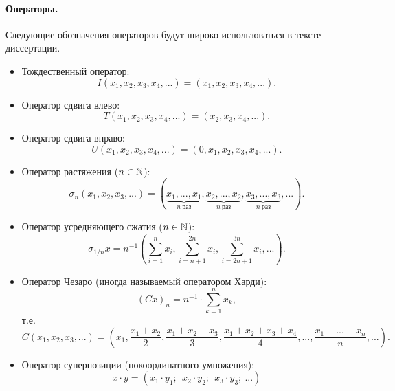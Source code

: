 \paragraph{Операторы.}
Следующие обозначения операторов будут широко использоваться в тексте диссертации.
\begin{itemize}
	\item
		Тождественный оператор:
		\begin{equation}
			I(x_1, x_2, x_3, x_4, ...) = (x_1, x_2, x_3, x_4, ...)
			.
		\end{equation}
	\item
		Оператор сдвига влево:
		\begin{equation}
			T(x_1, x_2, x_3, x_4, ...) = (x_2, x_3, x_4, ...)
			.
		\end{equation}
	\item
		Оператор сдвига вправо:
		\begin{equation}
			U(x_1, x_2, x_3, x_4, ...) = (0, x_1, x_2, x_3, x_4, ...)
			.
		\end{equation}
	\item
		Оператор растяжения ($n\in\mathbb{N}$):
		\begin{equation}
			\sigma_n (x_1, x_2, x_3, ...) = (
				\underbrace{x_1,...,x_1}_{n~\text{раз}},
				\underbrace{x_2,...,x_2}_{n~\text{раз}},
				\underbrace{x_3,...,x_3}_{n~\text{раз}},
				...)
			.
		\end{equation}
	\item
		Оператор усредняющего сжатия ($n\in\mathbb{N}$):
		\begin{equation}
			\sigma_{1/n} x = n^{-1}
			\left(
				\sum_{i=1}^{n} x_i,
				\sum_{i=n+1}^{2n} x_i,
				\sum_{i=2n+1}^{3n} x_i,
				...
			\right).
		\end{equation}
	\item
		Оператор Чезаро (иногда называемый оператором Харди):
		\begin{equation}
			(Cx)_n = n^{-1} \cdot \sum_{k=1}^n x_k
			,
		\end{equation}
		т.е.
		\begin{equation}
			C (x_1, x_2, x_3, ...) = \left(
			x_1,
			\dfrac{x_1+x_2}2,
			\dfrac{x_1+x_2 + x_3}3,
			\dfrac{x_1+x_2+x_3+x_4}4,
			...,
			\dfrac{x_1+...+x_n}n,
			...\right)
			.
		\end{equation}

	\item
		Оператор суперпозиции (покоординатного умножения):
		\begin{equation}
			x \cdot y = (x_1\cdot y_1; ~~x_2\cdot y_2; ~~x_3\cdot y_3; ~...)
		\end{equation}
\end{itemize}



